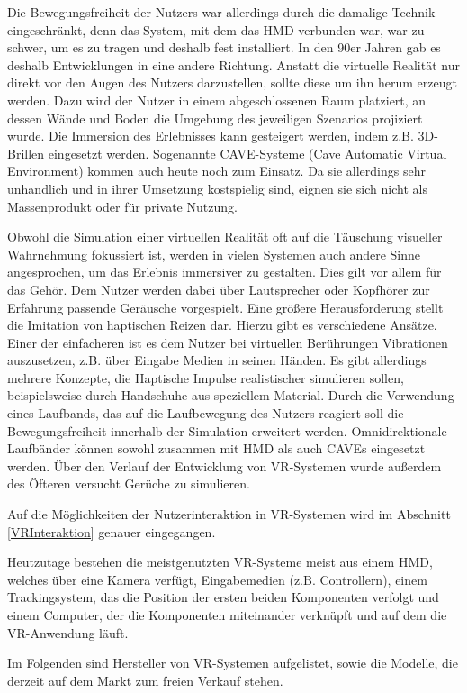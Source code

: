 Die Bewegungsfreiheit der Nutzers war allerdings durch die damalige Technik eingeschränkt, denn das System, mit dem das HMD verbunden war, war zu schwer, um es zu tragen und deshalb fest installiert. 
In den 90er Jahren gab es deshalb Entwicklungen in eine andere Richtung. Anstatt die virtuelle Realität nur direkt vor den Augen des Nutzers darzustellen, sollte diese um ihn herum erzeugt werden. Dazu wird der Nutzer in einem abgeschlossenen Raum platziert, an dessen Wände und Boden die Umgebung des jeweiligen Szenarios projiziert wurde. Die Immersion des Erlebnisses kann gesteigert werden, indem z.B. 3D-Brillen eingesetzt werden. Sogenannte CAVE-Systeme (Cave Automatic Virtual Environment) kommen auch heute noch zum Einsatz. Da sie allerdings sehr unhandlich und in ihrer Umsetzung kostspielig sind, eignen sie sich nicht als Massenprodukt oder für private Nutzung.

Obwohl die Simulation einer virtuellen Realität oft auf die Täuschung visueller Wahrnehmung fokussiert ist, werden in vielen Systemen auch andere Sinne angesprochen, um das Erlebnis immersiver zu gestalten. Dies gilt vor allem für das Gehör. Dem Nutzer werden dabei über Lautsprecher oder Kopfhörer zur Erfahrung passende Geräusche vorgespielt.
Eine größere Herausforderung stellt die Imitation von haptischen Reizen dar. Hierzu gibt es verschiedene Ansätze. Einer der einfacheren ist es dem Nutzer bei virtuellen Berührungen Vibrationen auszusetzen, z.B. über Eingabe Medien in seinen Händen. Es gibt allerdings mehrere Konzepte, die Haptische Impulse realistischer simulieren sollen, beispielsweise durch Handschuhe aus speziellem Material. %
Durch die Verwendung eines Laufbands, das auf die Laufbewegung des Nutzers reagiert soll die Bewegungsfreiheit innerhalb der Simulation erweitert werden. Omnidirektionale Laufbänder können sowohl zusammen mit HMD als auch CAVEs eingesetzt werden.
Über den Verlauf der Entwicklung von VR-Systemen wurde außerdem des Öfteren versucht Gerüche zu simulieren. %

Auf die Möglichkeiten der Nutzerinteraktion in VR-Systemen wird im Abschnitt \ref{VRInteraktion} genauer eingegangen.

Heutzutage bestehen die meistgenutzten VR-Systeme meist aus einem HMD, welches über eine Kamera verfügt, Eingabemedien (z.B. Controllern), einem Trackingsystem, das die Position der ersten beiden Komponenten verfolgt und einem Computer, der die Komponenten miteinander verknüpft und auf dem die VR-Anwendung läuft. 
  
Im Folgenden sind Hersteller von VR-Systemen aufgelistet, sowie die Modelle, die derzeit auf dem Markt zum freien Verkauf stehen.

